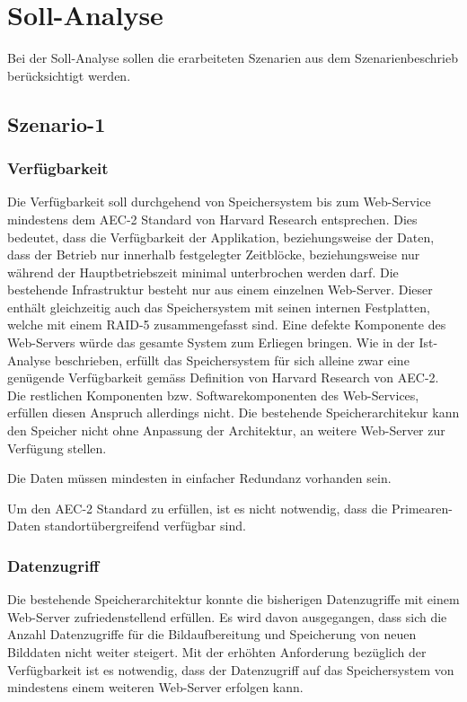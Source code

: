 \cleardoublepage
\chapter{Soll-Analyse}
Bei der Soll-Analyse sollen die erarbeiteten Szenarien aus dem Szenarienbeschrieb berücksichtigt werden. 

\section{Szenario-1}\label{Soll-1}

\subsection{Verfügbarkeit}
Die Verfügbarkeit soll durchgehend von Speichersystem bis zum Web-Service mindestens dem AEC-2 Standard von Harvard Research entsprechen. Dies bedeutet, dass die Verfügbarkeit der Applikation, beziehungsweise der Daten, dass der Betrieb nur innerhalb festgelegter Zeitblöcke, beziehungsweise nur während der Hauptbetriebszeit minimal unterbrochen werden darf. Die bestehende Infrastruktur besteht nur aus einem einzelnen Web-Server. Dieser enthält gleichzeitig auch das Speichersystem mit seinen internen Festplatten, welche mit einem RAID-5 zusammengefasst sind. Eine defekte Komponente des Web-Servers würde das gesamte System zum Erliegen bringen. Wie in der Ist-Analyse beschrieben, erfüllt das Speichersystem für sich alleine zwar eine genügende Verfügbarkeit gemäss Definition von Harvard Research von AEC-2. Die restlichen Komponenten bzw. Softwarekomponenten des Web-Services, erfüllen diesen Anspruch allerdings nicht. Die bestehende Speicherarchitekur kann den Speicher nicht ohne Anpassung der Architektur, an weitere Web-Server zur Verfügung stellen.

Die Daten müssen mindesten in einfacher Redundanz vorhanden sein. 

Um den AEC-2 Standard zu erfüllen, ist es nicht notwendig, dass die \gls{Primearen-Daten} standortübergreifend verfügbar sind.

\subsection{Datenzugriff}
Die bestehende Speicherarchitektur konnte die bisherigen Datenzugriffe mit einem Web-Server zufriedenstellend erfüllen. Es wird davon ausgegangen, dass sich die Anzahl Datenzugriffe für die Bildaufbereitung und Speicherung von neuen Bilddaten nicht weiter steigert. Mit der erhöhten Anforderung bezüglich der Verfügbarkeit ist es notwendig, dass der Datenzugriff auf das Speichersystem von mindestens einem weiteren Web-Server erfolgen kann. 

